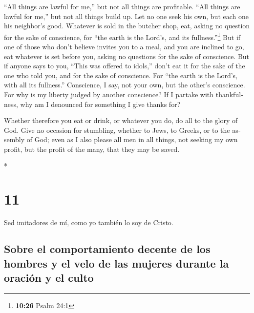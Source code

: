 \begin{paracol}{2}
\begin{otherlanguage}{english}
 ``All things are lawful for me,'' but not all things are
profitable. ``All things are lawful for me,'' but not all things build
up.  Let no one seek his own, but each one his neighbor's
good.  Whatever is sold in the butcher shop, eat, asking
no question for the sake of conscience,  for ``the earth
is the Lord's, and its fullness.''\footnote{\textbf{10:26} Psalm 24:1}
 But if one of those who don't believe invites you to a
meal, and you are inclined to go, eat whatever is set before you, asking
no questions for the sake of conscience.  But if anyone
says to you, ``This was offered to idols,'' don't eat it for the sake of
the one who told you, and for the sake of conscience. For ``the earth is
the Lord's, with all its fullness.''  Conscience, I say,
not your own, but the other's conscience. For why is my liberty judged
by another conscience?  If I partake with thankfulness,
why am I denounced for something I give thanks for?

 Whether therefore you eat or drink, or whatever you do,
do all to the glory of God.  Give no occasion for
stumbling, whether to Jews, to Greeks, or to the assembly of God;
 even as I also please all men in all things, not seeking
my own profit, but the profit of the many, that they may be saved.

\end{otherlanguage}

\switchcolumn[0]*

\hypertarget{section-20}{%
\section{11}\label{section-20}}

 Sed imitadores de mí, como yo también lo soy de Cristo.

\hypertarget{sobre-el-comportamiento-decente-de-los-hombres-y-el-velo-de-las-mujeres-durante-la-oraciuxf3n-y-el-culto}{%
\subsection{Sobre el comportamiento decente de los hombres y el velo de
las mujeres durante la oración y el
culto}\label{sobre-el-comportamiento-decente-de-los-hombres-y-el-velo-de-las-mujeres-durante-la-oraciuxf3n-y-el-culto}}


\end{paracol}
